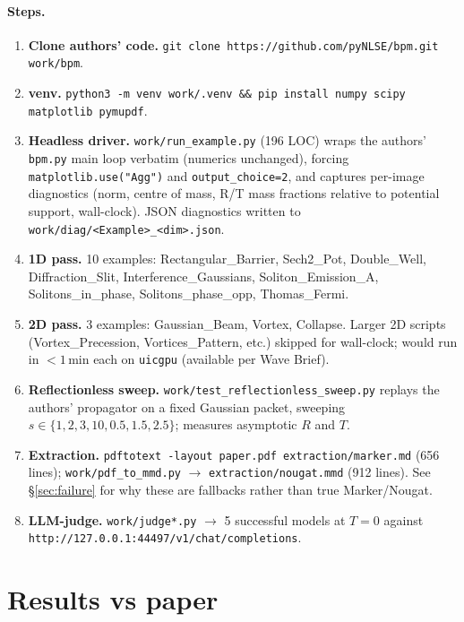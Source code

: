 \documentclass[11pt,a4paper]{article}
\begin{document}
\paragraph{Steps.}
\begin{enumerate}
  \item \textbf{Clone authors' code.} \texttt{git clone https://github.com/pyNLSE/bpm.git work/bpm}.
  \item \textbf{venv.} \texttt{python3 -m venv work/.venv \&\& pip install numpy scipy matplotlib pymupdf}.
  \item \textbf{Headless driver.} \texttt{work/run\_example.py} (196 LOC) wraps the authors' \texttt{bpm.py}
    main loop verbatim (numerics unchanged), forcing \texttt{matplotlib.use("Agg")} and
    \texttt{output\_choice=2}, and captures per-image diagnostics
    (norm, centre of mass, R/T mass fractions relative to potential support, wall-clock).
    JSON diagnostics written to \texttt{work/diag/<Example>\_<dim>.json}.
  \item \textbf{1D pass.} 10 examples: Rectangular\_Barrier, Sech2\_Pot, Double\_Well,
    Diffraction\_Slit, Interference\_Gaussians, Soliton\_Emission\_A,
    Solitons\_in\_phase, Solitons\_phase\_opp, Thomas\_Fermi.
  \item \textbf{2D pass.} 3 examples: Gaussian\_Beam, Vortex, Collapse.
    Larger 2D scripts (Vortex\_Precession, Vortices\_Pattern, etc.) skipped for wall-clock;
    would run in $<1\,\text{min}$ each on \texttt{uicgpu} (available per Wave Brief).
  \item \textbf{Reflectionless sweep.} \texttt{work/test\_reflectionless\_sweep.py} replays
    the authors' propagator on a fixed Gaussian packet, sweeping
    $s\in\{1,2,3,10,0.5,1.5,2.5\}$; measures asymptotic $R$ and $T$.
  \item \textbf{Extraction.}
    \texttt{pdftotext -layout paper.pdf extraction/marker.md} (656 lines);
    \texttt{work/pdf\_to\_mmd.py} $\rightarrow$ \texttt{extraction/nougat.mmd} (912 lines).
    See \S\ref{sec:failure} for why these are fallbacks rather than true Marker/Nougat.
  \item \textbf{LLM-judge.} \texttt{work/judge*.py} $\rightarrow$
    5 successful models at $T{=}0$ against \texttt{http://127.0.0.1:44497/v1/chat/completions}.
\end{enumerate}

\section{Results vs paper}
\label{sec:results}
\end{document}
